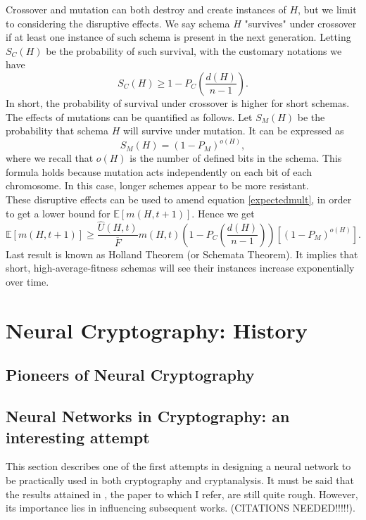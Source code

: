\documentclass[%
    corpo=11pt,
    twoside,
    stile=classica,
    oldstyle,
    autoretitolo,
    tipotesi=magistrale,
    greek,
    evenboxes,
    english
]{toptesi}
\begin{document}
Crossover and mutation can both destroy and create instances of $H$, but we limit to considering the disruptive effects. We say schema $H$ "survives" under crossover if at least one instance of such schema is present in the next generation. Letting $S_C(H)$ be the probability of such survival, with the customary notations we have
\begin{equation}
S_C(H) \geq 1 - P_C\left(\frac{d(H)}{n-1} \right).
\end{equation}
In short, the probability of survival under crossover is higher for short schemas. \\
The effects of mutations can be quantified as follows. Let $S_M(H)$ be the probability that schema $H$ will survive under mutation. It can be expressed as
\begin{equation}
S_M(H) = (1-P_M)^{o(H)},
\end{equation}
where we recall that $o(H)$ is the number of defined bits in the schema. This formula holds because mutation acts independently on each bit of each chromosome. In this case, longer schemes appear to be more resistant. \\
These disruptive effects can be used to amend equation \eqref{expectedmult}, in order to get a lower bound for $\mathbb{E}\left[m(H, t + 1) \right]$. Hence we get
\begin{equation}
\mathbb{E}\left[m(H, t + 1) \right] \geq \frac{\hat{U}(H,t)}{\overline{F}}m(H,t)\left( 1 - P_C\left(\frac{d(H)}{n-1} \right)\right)\left[ (1-P_M)^{o(H)}\right].
\end{equation}
Last result is known as Holland Theorem (or Schemata Theorem). It implies that short, high-average-fitness schemas will see their instances increase exponentially over time.

\chapter{Neural Cryptography: History}
\section{Pioneers of Neural Cryptography}
\newpage

\section{Neural Networks in Cryptography: an interesting attempt}
This section describes one of the first attempts in designing a neural network to be practically used in both cryptography and cryptanalysis. It must be said that the results attained in \cite{volna}, the paper to which I refer, are still quite rough. However, its importance lies in influencing subsequent works. (CITATIONS NEEDED!!!!!).
\end{document}
